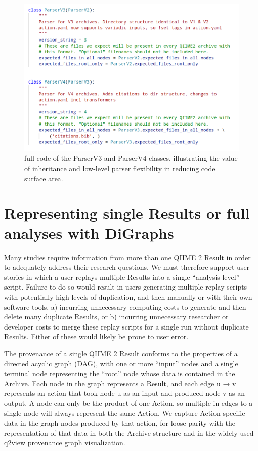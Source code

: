 
\begin{figure}[htp]
\centering
\includegraphics[width=\textwidth]{figures/parserCodeBlock.png}
\caption[Code snippet illustrating the value of inheritance to ArchiveParser Versions]%
{full code of the ParserV3 and ParserV4 classes, illustrating the value of
inheritance and low-level parser flexibility in reducing code surface area.}
\label{fig:parserCodeBlock}
\end{figure}

\section{Representing single Results or full analyses with DiGraphs}

Many studies require information from more than one QIIME 2 Result in order to
adequately address their research questions. We must therefore support user
stories in which a user replays multiple Results into a single “analysis-level”
script. Failure to do so would result in users generating multiple replay
scripts with potentially high levels of duplication, and then manually or with
their own software tools, a) incurring unnecessary computing costs to generate
and then delete many duplicate Results, or b) incurring unnecessary researcher
or developer costs to merge these replay scripts for a single run without
duplicate Results. Either of these would likely be prone to user error. 

The provenance of a single QIIME 2 Result conforms to the properties of a
directed acyclic graph (DAG), with one or more “input” nodes and a single
terminal node representing the “root” node whose data is contained in the
Archive. Each node in the graph represents a Result, and each edge u → v
represents an action that took node u as an input and produced node v as an
output. A node can only be the product of one Action, so multiple in-edges to a
single node will always represent the same Action. We capture Action-specific
data in the graph nodes produced by that action, for loose parity with the
representation of that data in both the Archive structure and in the widely used
q2view provenance graph visualization. 

